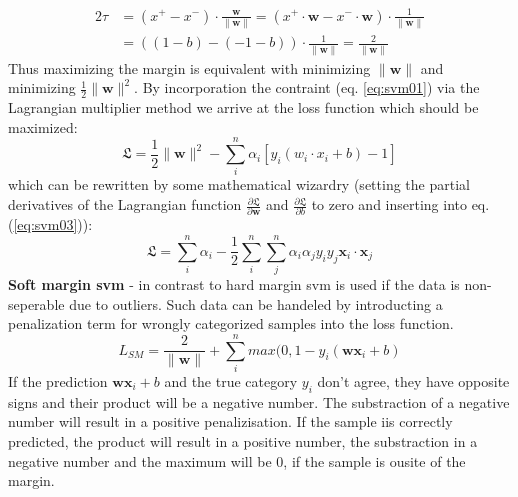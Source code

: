 \fi
\begin{equation}
	\label{eq:svm02}
	\begin{aligned} 
		2\tau &= (x^+ - x^-) \cdot \frac{\mathbf{w}}{\|\mathbf{w}\|} 
			= (x^+ \cdot \mathbf{w} - x^-\cdot \mathbf{w} ) \cdot \frac{1}{\|\mathbf{w}\|} \\
			&= ( (1-b) - (-1-b) ) \cdot \frac{1}{\|\mathbf{w}\|} 
			= \frac{2}{\|\mathbf{w}\|}
	\end{aligned}
\end{equation}
Thus maximizing the margin is equivalent with minimizing $\|\mathbf{w}\|$ and minimizing $\frac{1}{2}\|\mathbf{w}\|^2$.
By incorporation the contraint (eq. \ref{eq:svm01}) via the Lagrangian multiplier method we arrive at the loss function which should be maximized: 
\begin{equation}
	\label{eq:svm03}
	\mathfrak{L} = \frac{1}{2} \|\mathbf{w}\|^2 - \sum_i^n \alpha_i [ y_i ( w_i \cdot x_i + b) -1 ] 
\end{equation}
which can be rewritten by some mathematical wizardry (setting the partial derivatives of the Lagrangian function
$\frac{\partial \mathfrak{L}}{\partial \mathbf{w}}$ and $\frac{\partial \mathfrak{L}}{\partial b}$ 
to zero and inserting into eq. (\ref{eq:svm03}))\cite{winston1992artificial,cherkassky1998learning}: 
\begin{equation}
	\label{eq:svm04}
	\mathfrak{L} = \sum_i^n \alpha_i - \frac{1}{2} \sum_i^n \sum_j^n \alpha_i \alpha_j y_i y_j \mathbf{x}_i \cdot \mathbf{x}_j 
\end{equation}
%
\textbf{Soft margin \gls{svm}} - in contrast to hard margin \gls{svm} is used if the data is non-seperable due to outliers\cite{cortes1995support}.
Such data can be handeled by introducting a penalization term for wrongly categorized samples into the loss function. 
\begin{equation}
	\label{eq:svm-soft}
	L_{SM} = \frac{2} {\|\mathbf{w}\|} + \sum_i^n max(0, 1- y_i ( \mathbf{w} \mathbf{x}_i + b ) 
\end{equation}
If the prediction $\mathbf{w}\mathbf{x}_i+b$ and the true category $y_i$ don't agree, 
they have opposite signs and their product will be a negative number.
The substraction of a negative number will result in a positive penalizisation. 
If the sample iis correctly predicted, the product will result in a positive number, 
the substraction in a negative number and the maximum will be 0, if the sample is ousite of the margin. 

